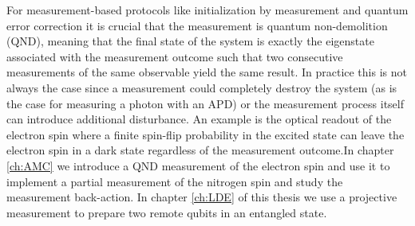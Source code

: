 For measurement-based protocols like initialization by measurement and quantum error correction\cite{Devoret_Science_2013} it is crucial that the measurement is quantum non-demolition (QND)\cite{Braginsky_Science_1980}, meaning that the final state of the system is exactly the eigenstate associated with the measurement outcome such that two consecutive measurements of the same observable yield the same result. In practice this is not always the case since a measurement could completely destroy the system (as is the case for measuring a photon with an APD) or the measurement process itself can introduce additional disturbance. An example is the optical readout of the electron spin where a finite spin-flip probability in the excited state can leave the electron spin in a dark state regardless of the measurement outcome.In chapter \ref{ch:AMC} we introduce a QND measurement of the electron spin and use it to implement a partial measurement of the nitrogen spin and study the measurement back-action. In chapter \ref{ch:LDE} of this thesis we use a projective measurement to prepare two remote qubits in an entangled state.

\newpage





